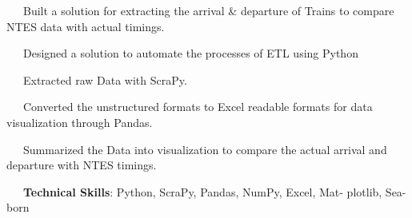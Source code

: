 \documentclass[a4paper,20pt]{article}
\begin{document}
     \begin{description}[font=$\bullet$]
        \item {~~~}{Built a solution for extracting the arrival \& departure of Trains to compare NTES data with actual timings.}
        \vspace{-5pt}
        \item {~~~}{Designed a solution to automate the processes of ETL using Python}
        \vspace{-5pt}
        \item {~~~}{Extracted raw Data with ScraPy.}
        \vspace{-5pt}
        \item {~~~}{Converted the unstructured formats to Excel readable formats for data visualization through Pandas.}
        \vspace{-5pt}
        \item {~~~}{Summarized the Data into visualization to compare the actual arrival and departure with NTES timings.}
        \vspace{-5pt}
        \item {~~~}{\textbf{Technical Skills}: Python, ScraPy, Pandas, NumPy, Excel, Mat- plotlib, Sea-born}
        
    \end{description}

\vspace{-5pt}
\end{document}
